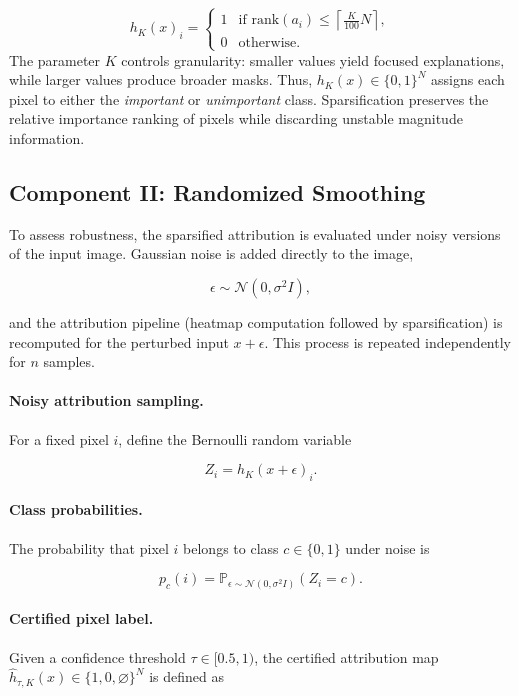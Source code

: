 \documentclass[11pt]{article}
\begin{document}
$$
h_K(x)_i =
\begin{cases}
1 & \text{if } \mathrm{rank}(a_i) \le \left\lceil \frac{K}{100} N \right\rceil, \\
0 & \text{otherwise}.
\end{cases}
$$
The parameter $K$ controls granularity: smaller values yield focused explanations, while larger values produce broader masks.
Thus, $h_K(x) \in \{0,1\}^N$ assigns each pixel to either the \emph{important} or \emph{unimportant} class.
Sparsification preserves the relative importance ranking of pixels while discarding unstable magnitude information. 

\subsection{Component II: Randomized Smoothing}

To assess robustness, the sparsified attribution is evaluated under noisy versions of the input image. Gaussian noise is added directly to the image,

$$
\epsilon \sim \mathcal{N}(0, \sigma^2 I),
$$

and the attribution pipeline (heatmap computation followed by sparsification) is recomputed for the perturbed input $x+\epsilon$. This process is repeated independently for $n$ samples.

\paragraph{Noisy attribution sampling.}
For a fixed pixel $i$, define the Bernoulli random variable

$$
Z_i = h_K(x+\epsilon)_i.
$$

\paragraph{Class probabilities.}
The probability that pixel $i$ belongs to class $c \in \{0,1\}$ under noise is

$$
p_c(i) = \mathbb{P}_{\epsilon \sim \mathcal{N}(0, \sigma^2 I)}\left(Z_i = c\right).
$$

\paragraph{Certified pixel label.}
Given a confidence threshold $\tau \in [0.5,1)$, the certified attribution map $\hat{h}_{\tau,K}(x) \in \{1,0,\varnothing\}^N$ is defined as
\end{document}
